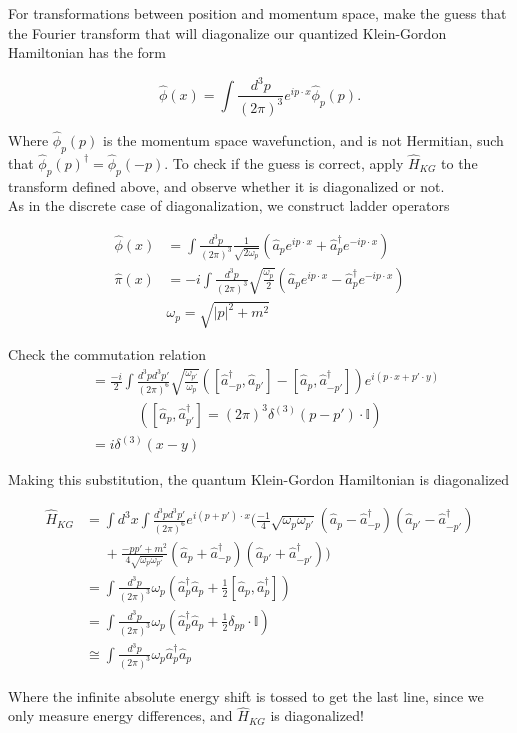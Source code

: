\noindent For transformations between position and momentum space, make the guess that the Fourier transform that will diagonalize our quantized Klein-Gordon Hamiltonian has the form 

\begin{equation}
\hat{\phi}(x) = \int \frac{d^3 p}{(2\pi)^3} e^{i p \cdot x} \hat{\phi}_p(p).
\end{equation}

\noindent Where $\hat{\phi}_p(p)$ is the momentum space wavefunction, and is not Hermitian, such that $\hat{\phi}_p(p)^\dagger = \hat{\phi}_p(-p)$. To check if the guess is correct, apply $\hat{H}_{KG}$ to the transform defined above, and observe whether it is diagonalized or not. \\

\noindent As in the discrete case of diagonalization, we construct ladder operators

\begin{align}
\hat{\phi}(x) &= \int \frac{d^3 p}{(2 \pi)^3} \frac{1}{\sqrt{2 \omega_p}} \left( \hat{a}_p e^{ip \cdot x} + \hat{a}_p^\dagger e^{-ip \cdot x} \right) \\
\hat{\pi}(x) &=-i  \int \frac{d^3 p}{(2 \pi)^3} \sqrt{\frac{\omega_p}{2}} \left( \hat{a}_p e^{ip \cdot x} - \hat{a}_p^\dagger e^{-ip \cdot x} \right) \\
&\omega_p = \sqrt{ |p|^2 + m^2}
\end{align}

\noindent Check the commutation relation
\begin{align}
[ \hat{\phi}(x), \hat{\pi}(x') ] &= \frac{-i}{2} \int \frac{d^3 p d^3 p'}{(2 \pi)^6} \sqrt{\frac{\omega_{p'}}{\omega_p}} \left( [\hat{a}_{-p}^\dagger, \hat{a}_{p'}] - [\hat{a}_p, \hat{a}_{-p'}^\dagger] \right) e^{i(p \cdot x+p' \cdot y)} \\
& \,\,\,\, \,\,\,\, \,\,\,\, \,\,\,\, \,\,\,\, \left( [\hat{a}_p, \hat{a}_{p'}^\dagger] = (2\pi)^3 \delta^{(3)}(p-p') \cdot \mathbb{I} \right) \\
 &= i \delta^{(3)}(x-y) 
\end{align}

\noindent Making this substitution, the quantum Klein-Gordon Hamiltonian is diagonalized

\begin{align}
\hat{H}_{KG} &= \int d^3 x \int \frac{d^3 p d^3 p'}{(2 \pi)^6} e^{i(p+p') \cdot x} ( \frac{-1}{4} \sqrt{\omega_p \omega_{p'}} (\hat{a}_p - \hat{a}_{-p}^\dagger)(\hat{a}_{p'} - \hat{a}_{-p'}^\dagger) \\
&\,\,\,\, \,\,\,\, + \frac{-pp' + m^2}{4 \sqrt{\omega_p \omega_{p'}}} (\hat{a}_p + \hat{a}_{-p}^\dagger)(\hat{a}_{p'} + \hat{a}_{-p'}^\dagger) ) \\
&= \int \frac{d^3 p}{(2\pi)^3} \omega_p (\hat{a}_p^\dagger \hat{a}_p + \frac{1}{2} [\hat{a}_p, \hat{a}_p^\dagger]) \\
&= \int \frac{d^3 p}{(2\pi)^3} \omega_p (\hat{a}_p^\dagger \hat{a}_p + \frac{1}{2} \delta_{pp} \cdot \mathbb{I}) \\
&\cong \int \frac{d^3 p}{(2\pi)^3} \omega_p \hat{a}_p^\dagger \hat{a}_p
\end{align}

\noindent Where the infinite absolute energy shift is tossed to get the last line, since we only measure energy differences, and $\hat{H}_{KG}$ is diagonalized!